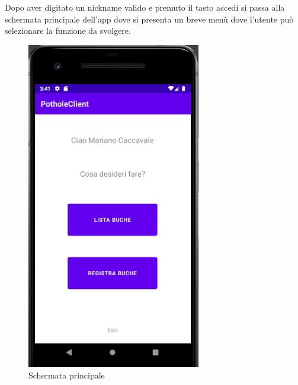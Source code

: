 \documentclass[a4paper,11pt]{report}
\begin{document}
Dopo aver digitato un nickname valido e premuto il tasto accedi si passa alla schermata principale dell'app dove si presenta un breve menù dove l'utente può selezionare la funzione da svolgere.\newline  
\begin{figure} [H]
\centering
\includegraphics[scale = 0.65]{menu_screen}
\caption{Schermata principale}
\end{figure}
\end{document}
